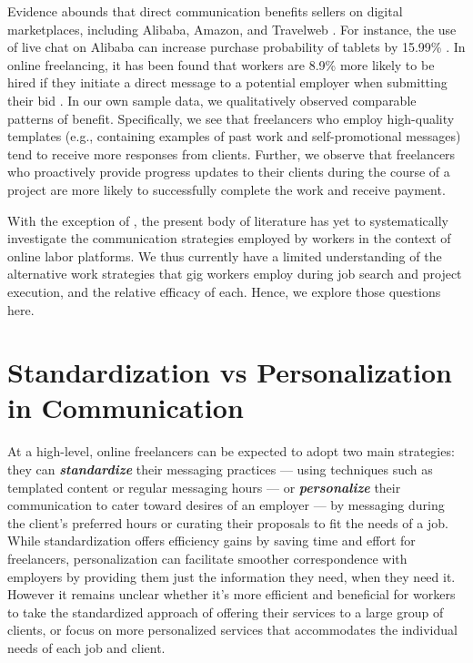Evidence abounds that direct communication benefits sellers on digital marketplaces, including Alibaba, Amazon, and Travelweb \cite{trust, alibaba}. For instance, the use of live chat on Alibaba can increase purchase probability of tablets by 15.99\% \cite{alibaba}. In online freelancing, it has been found that {workers} are 8.9\% more likely to be hired if they initiate a direct message to a potential employer when submitting their bid \cite{Hong2021-hj}. {In our own sample data, we qualitatively observed comparable patterns of benefit}. Specifically, we see that freelancers who employ high-quality templates (e.g., containing examples of past work and self-promotional messages) tend to receive more responses from clients. Further, we observe that freelancers who proactively provide progress updates to their clients during the course of a project are more likely to successfully complete the work and receive payment.  

With the exception of \cite{Hong2021-hj}, the present body of literature has yet to systematically investigate the communication strategies employed by workers in the context of online labor platforms. We thus currently have a limited understanding of the alternative work strategies that gig workers employ during job search and project execution, and the relative efficacy of each. Hence, we explore those questions here.


\section{Standardization vs Personalization in Communication} \label{grounding}

At a high-level, online freelancers can be expected to adopt two main strategies: they can \textbf{\textit{standardize}} their messaging practices --- using techniques such as templated content or regular messaging hours --- or \textbf{\textit{personalize}} their communication to cater toward desires of an employer --- by messaging during the client's preferred hours or curating their proposals to fit the needs of a job. While standardization offers efficiency gains by saving time and effort for freelancers, personalization can facilitate smoother correspondence with employers by providing them just the information they need, when they need it. However it remains unclear whether it's more efficient and beneficial for workers to take the standardized approach of offering their services to a large group of clients, or focus on more personalized services that accommodates the individual needs of each job and client. 

